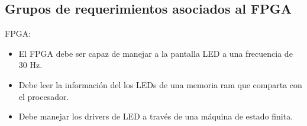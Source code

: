 \subsection{Grupos de requerimientos asociados al FPGA}
FPGA:
\begin{itemize}
\item El FPGA debe ser capaz de manejar a la pantalla LED a una frecuencia de  30 Hz.
\item Debe leer la información del los LEDs de una memoria ram que comparta con el procesador.
\item Debe manejar los drivers de LED a través de una máquina de estado finita.   
\end{itemize}